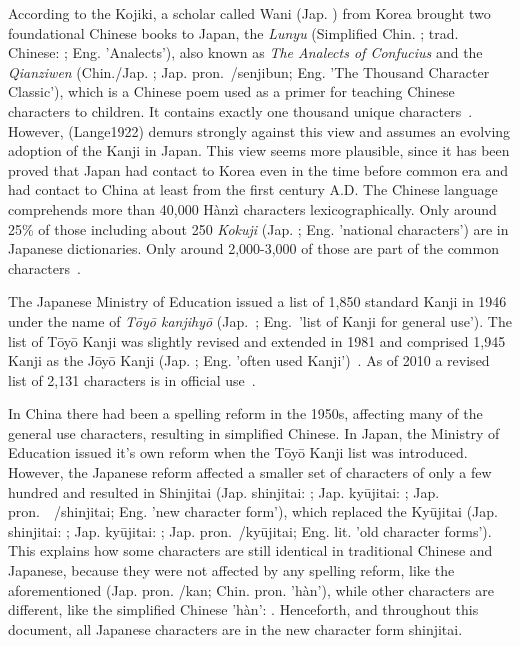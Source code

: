 According to the Kojiki, a scholar called Wani (Jap. ) from Korea 
brought two foundational Chinese books to Japan, the \emph{Lunyu} 
(Simplified Chin. ; trad. Chinese: ; Eng. 'Analects'), 
also known as \emph{The Analects of Confucius} and 
the \emph{Qianziwen} (Chin./Jap. ; Jap. 
pron.~/senjibun; Eng. 'The Thousand Character Classic'),
which is a Chinese poem used as a primer for teaching Chinese characters to 
children. It contains exactly one thousand unique 
characters~. However, \shortcite(Lange1922) demurs 
strongly against this view and assumes an evolving adoption of the Kanji in
Japan. This view seems more plausible, since it has been proved that Japan 
had contact to Korea even in the time before common era and had contact to 
China at least from the first century A.D. The Chinese language comprehends more
than 40,000 Hànzì characters lexicographically. Only around 25\% of those 
including about 250 \emph{Kokuji} (Jap. ; Eng. 'national characters') 
are in Japanese dictionaries. Only around 2,000-3,000 of those are part of the 
common characters~. 

The Japanese Ministry of Education issued a list of 1,850 standard Kanji in 1946
under the name of \emph{Tōyō kanjihyō} (Jap.~;
Eng.~'list of Kanji for general use'). The list of Tōyō Kanji was slightly 
revised and extended in 1981 and comprised 1,945 Kanji as the Jōyō Kanji
(Jap. ; Eng. 'often used Kanji')~.
As of 2010 a revised list of 2,131 characters is in official 
use~. 

In China there had been a spelling reform in the 1950s, affecting many of the
general use characters, resulting in simplified Chinese. In Japan, the Ministry
of Education issued it's own reform when the Tōyō Kanji list was introduced.
However, the Japanese reform affected a smaller set of characters of only a few 
hundred and resulted in Shinjitai (Jap. shinjitai: ; 
Jap. kyūjitai: ;
Jap. pron.　/shinjitai; Eng. 'new character form'), 
which replaced the Kyūjitai 
(Jap. shinjitai: ; Jap. kyūjitai: ; 
Jap. pron.~/kyūjitai; Eng. lit. 'old character forms'). 
This explains how some characters are still identical in traditional Chinese and 
Japanese, because they were not affected by any spelling reform, like the 
aforementioned  (Jap. pron. /kan; Chin. pron. 'hàn'),
while other characters are different, like the simplified 
Chinese 'hàn': . Henceforth, and throughout this document, all Japanese characters are in the new character form shinjitai.

